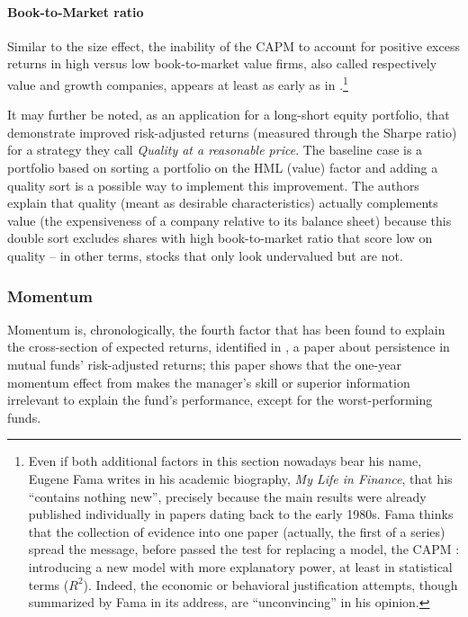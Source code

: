 \paragraph{Book-to-Market ratio}
Similar to the size effect, the inability of the CAPM to account for positive excess returns in high versus low book-to-market value firms, also called respectively value and growth companies, appears at least as early as in \textcite{Rosenberg1985}.\footnote{Even if both additional factors in this section nowadays bear his name, Eugene Fama writes in his academic biography, \emph{My Life in Finance}, that his \textcite{Fama1992} ``contains nothing new'', precisely because the main results were already published individually in papers dating back to the early 1980s. Fama thinks that the collection of evidence into one paper (actually, the first of a series) spread the message, before \textcite{Fama1993} passed the test for replacing a model, the CAPM : introducing a new model with more explanatory power, at least in statistical terms ($R^{2}$). Indeed, the economic or behavioral justification attempts, though summarized by Fama in its address, are ``unconvincing'' in his opinion.} 

It may further be noted, as an application for a long-short equity portfolio, that \textcite{Asness2019} demonstrate improved risk-adjusted returns (measured through the Sharpe ratio) for a strategy they call \emph{Quality at a reasonable price}. The baseline case is a portfolio based on sorting a portfolio on the HML (value) factor and adding a quality sort is a possible way to implement this improvement. The authors explain that quality (meant as desirable characteristics) actually complements value (the expensiveness of a company relative to its balance sheet) because this double sort excludes shares with high book-to-market ratio that score low on quality -- in other terms, stocks that only look undervalued but are not.
\subsubsection{Momentum}
\label{subsub:Momentum}
Momentum is, chronologically, the fourth factor that has been found to explain the cross-section of expected returns, identified in \textcite{Carhart1997}, a paper about persistence in mutual funds' risk-adjusted returns; this paper shows that the one-year momentum effect from \textcite{Jegadeesh1993} makes the manager's skill or superior information irrelevant to explain the fund's performance, except for the worst-performing funds.

